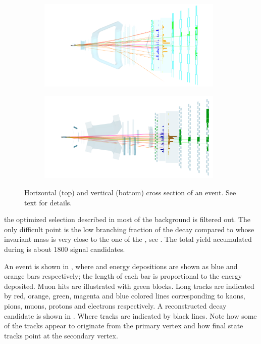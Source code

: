 \begin{figure}[!h]
  \centering
  \begin{subfigure}{\textwidth}
    \includegraphics[width=0.97\textwidth, trim=7cm 0cm 6cm 0cm, clip=true]{Figures/Chapter2/top}
    \label{det_evt_display_top}
  \end{subfigure}
  \begin{subfigure}{\textwidth}
    \includegraphics[width=0.97\textwidth, trim=5cm 0cm 3cm 0cm, clip=true]{Figures/Chapter2/side}
    \label{det_evt_display_side}
  \end{subfigure}
  \caption{Horizontal (top) and vertical (bottom) cross section of an \lhcb event. See text for details.}
  \label{det_evt_display}
\end{figure}


\noindent the optimized selection described in  most of the background
is filtered out. The only difficult point is the low branching fraction of the \BsJpsiKst decay
compared to \BdJpsiKst whose invariant mass is very close to the one of the \BsJpsiKst, see .
The total \BsJpsiKst yield accumulated during \runone is about 1800 signal candidates.

An \lhcb event is shown in , where \ecal and \hcal energy depositions are
shown as blue and orange bars respectively; the length of each bar is proportional to the energy
deposited. Muon hits are illustrated with green blocks. Long tracks are indicated by red, orange,
green, magenta and blue colored lines corresponding to kaons, pions, muons, protons and electrons
respectively. A reconstructed \BsJpsiKst decay candidate is shown in .
Where \velo tracks are indicated by black lines. Note how some of the \velo tracks appear
to originate from the primary vertex and how \Bs final state tracks point at the secondary vertex.
